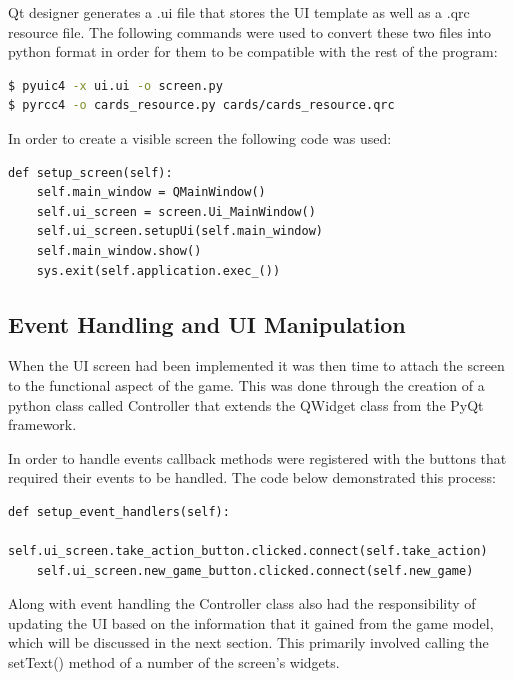 Qt designer generates a .ui file that stores the UI template as well as a .qrc resource file.
The following commands were used to convert these two files into python format in order for them
to be compatible with the rest of the program:
\begin{lstlisting}[language=bash]
$ pyuic4 -x ui.ui -o screen.py
$ pyrcc4 -o cards_resource.py cards/cards_resource.qrc
\end{lstlisting}

In order to create a visible screen the following code was used:

\begin{lstlisting}[style=Python]
def setup_screen(self):
    self.main_window = QMainWindow()
    self.ui_screen = screen.Ui_MainWindow()
    self.ui_screen.setupUi(self.main_window)
    self.main_window.show()
    sys.exit(self.application.exec_())
\end{lstlisting}

\subsection{Event Handling and UI Manipulation}\label{subsec:eventHandling}
When the UI screen had been implemented it was then time to attach the screen to the
functional aspect of the game.
This was done through the creation of a python class called Controller that extends the QWidget
class from the PyQt framework.

In order to handle events callback methods were registered with the buttons that required their events to be handled.
The code below demonstrated this process:
\begin{lstlisting}[style=Python]
def setup_event_handlers(self):
    self.ui_screen.take_action_button.clicked.connect(self.take_action)
    self.ui_screen.new_game_button.clicked.connect(self.new_game)
\end{lstlisting}

Along with event handling the Controller class also had the responsibility of updating the
UI based on the information that it gained from the game model, which will be discussed in the next section.
This primarily involved calling the setText() method of a number of the screen's widgets.

